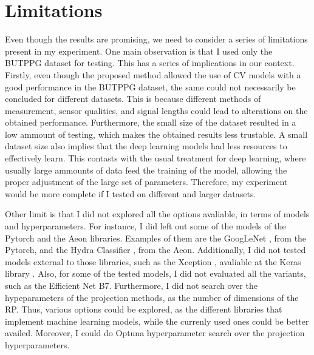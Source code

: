 




\section{Limitations}

Even though the results are promising, we need to consider a series of limitations present in my experiment. One main observation is that I used only the BUTPPG dataset for testing. This has a series of implications in our context. Firstly, even though the proposed method allowed the use of \acrshort{CV} models with a good performance in the BUTPPG dataset, the same could not necessarily be concluded for different datasets. This is because different methods of measurement, sensor qualities, and signal lengths could lead to alterations on the obtained performance. Furthermore, the small size of the dataset resulted in a low ammount of testing, which makes the obtained results less trustable. A small dataset size also implies that the deep learning models had less resources to effectively learn. This contasts with the usual treatment for deep learning, where usually large ammounts of data feed the training of the model, allowing the proper adjustment of the large set of parameters. Therefore, my experiment would be more complete if I tested on different and larger datasets.

Other limit is that I did not explored all the options avaliable, in terms of models and hyperparameters. For instance, I did left out some of the models of the Pytorch and the Aeon libraries. Examples of them are the GoogLeNet \cite{GoogLeNet}, from the Pytorch, and the Hydra Classifier \cite{HydraClassifier}, from the Aeon. Additionally, I did not tested models external to those libraries, such as the Xception \cite{Xception}, avaliable at the Keras library \cite{Keras}. Also, for some of the tested models, I did not evaluated all the variants, such as the Efficient Net B7. Furthermore, I did not search over the hypeparameters of the projection methods, as the number of dimensions of the \acrshort{RP}. Thus, various options could be explored, as the different libraries that implement machine learning models, while the currenly used ones could be better availed. Moreover, I could do Optuna hyperparameter search over the projection hyperparameters.

